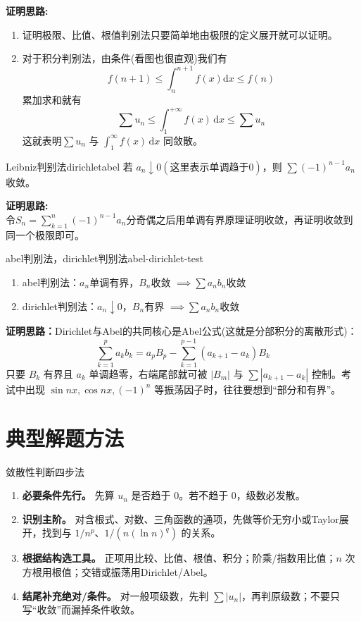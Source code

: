 \documentclass[UTF8,zihao=-4,openany]{ctexbook}
\newcommand{\dd}{\,\mathrm{d}}
\begin{document}
\noindent\textbf{证明思路:} \begin{enumerate}
    \item [1,]证明极限、比值、根值判别法只要简单地由极限的定义展开就可以证明。
    \item [2,]对于积分判别法，由条件(看图也很直观)我们有\[
    f(n+1)\leq \int_{n}^{n+1}f(x)\mathrm{d}x\leq f(n)
    \]累加求和就有\[
    \sum u_n\leq \int_{1}^{+\infty}f(x)\dd x\leq \sum u_n
    \]这就表明$\sum u_n$ 与 $\int_1^\infty f(x)\dd x$ 同敛散。
\end{enumerate}
\begin{theorem}{Leibniz判别法}{dirichletabel}
若 $a_n\downarrow0$\((\text{这里表示单调趋于0})\)，则 $\sum (-1)^{n-1}a_n$ 收敛。
\end{theorem}
\noindent\textbf{证明思路:}\\
令\(S_n=\sum_{k=1}^{n}(-1)^{n-1}a_n\)分奇偶之后用单调有界原理证明收敛，再证明收敛到同一个极限即可。

\begin{theorem}{abel判别法，dirichlet判别法}{abel-dirichlet-test}
    \begin{enumerate}
        \item[1] abel判别法：\(a_n\)单调有界，\(B_n\)收敛 \(\implies\sum a_nb_n\)收敛
        \item[2] dirichlet判别法：\(a_n\downarrow0\)，\(B_n\)有界 \(\implies\sum a_nb_n\)收敛
    \end{enumerate}
\end{theorem}
\textbf{证明思路：}Dirichlet与Abel的共同核心是Abel公式(这就是分部积分的离散形式)：
\[
\sum_{k=1}^{p}a_kb_k=a_pB_p-\sum_{k=1}^{p-1}(a_{k+1}-a_k)B_k
\]
只要 $B_k$ 有界且 $a_k$ 单调趋零，右端尾部就可被 $|B_m|$ 与 $\sum |a_{k+1}-a_{k}|$ 控制。考试中出现 $\sin nx,\cos nx,(-1)^n$ 等振荡因子时，往往要想到“部分和有界”。


\section{典型解题方法}
\begin{methodbox}{敛散性判断四步法}
\begin{enumerate}
\item \textbf{必要条件先行。} 先算 $u_n$ 是否趋于 $0$。若不趋于 $0$，级数必发散。
\item \textbf{识别主阶。} 对含根式、对数、三角函数的通项，先做等价无穷小或Taylor展开，找到与 $1/n^p$、$1/(n(\ln n)^q)$ 的关系。
\item \textbf{根据结构选工具。} 正项用比较、比值、根值、积分；阶乘/指数用比值；$n$ 次方根用根值；交错或振荡用Dirichlet/Abel。
\item \textbf{结尾补充绝对/条件。} 对一般项级数，先判 $\sum |u_n|$，再判原级数；不要只写“收敛”而漏掉条件收敛。
\end{enumerate}
\end{methodbox}
\end{document}
